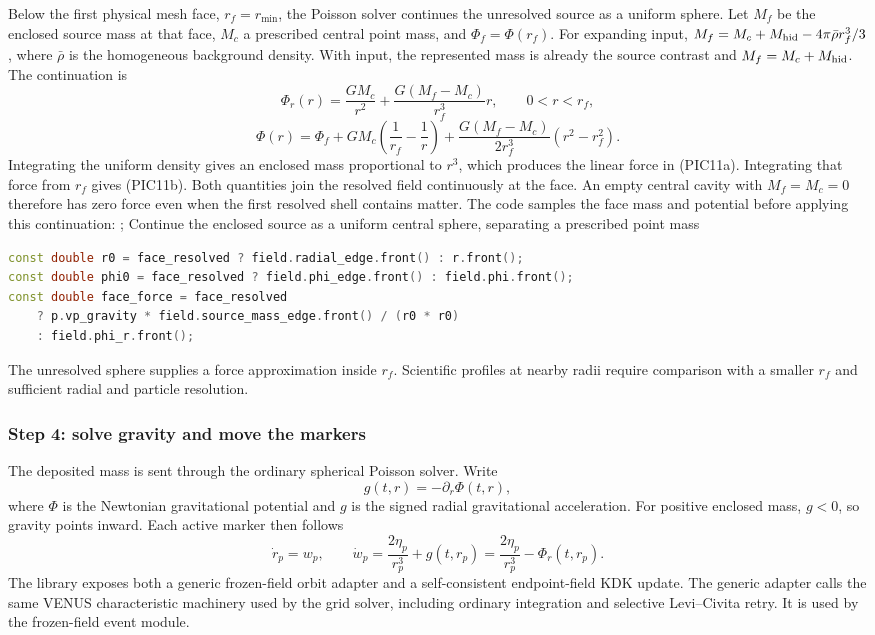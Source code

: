 Below the first physical mesh face, \(r_f=r_{\min}\), the Poisson solver
continues the unresolved source as a uniform sphere. Let \(M_f\) be the
enclosed source mass at that face, \(M_c\) a prescribed central point mass,
and \(\Phi_f=\Phi(r_f)\). For expanding  input,
\(M_f=M_c+M_{\rm hid}-4\pi\bar\rho r_f^3/3\), where
\(\bar\rho\) is the homogeneous background density. With
 input, the represented mass is already the
source contrast and \(M_f=M_c+M_{\rm hid}\). The continuation is
\[
 \Phi_r(r)=\frac{GM_c}{r^2}
          +\frac{G(M_f-M_c)}{r_f^3}r,\qquad 0<r<r_f,       \tag{PIC11a}
\]
\[
 \Phi(r)=\Phi_f+GM_c\left(\frac{1}{r_f}-\frac{1}{r}\right)
       +\frac{G(M_f-M_c)}{2r_f^3}(r^2-r_f^2).             \tag{PIC11b}
\]
Integrating the uniform density gives an enclosed mass proportional to
\(r^3\), which produces the linear force in (PIC11a). Integrating that
force from \(r_f\) gives (PIC11b). Both quantities join the resolved field
continuously at the face. An empty central cavity with \(M_f=M_c=0\)
therefore has zero force even when the first resolved shell contains matter.
The code samples the face mass and potential before applying this continuation:
{; }
{Continue the enclosed source as a uniform central sphere, separating a prescribed point mass}
\begin{lstlisting}[language=C++]
const double r0 = face_resolved ? field.radial_edge.front() : r.front();
const double phi0 = face_resolved ? field.phi_edge.front() : field.phi.front();
const double face_force = face_resolved
    ? p.vp_gravity * field.source_mass_edge.front() / (r0 * r0)
    : field.phi_r.front();
\end{lstlisting}
The unresolved sphere supplies a force approximation inside \(r_f\).
Scientific profiles at nearby radii require comparison with a smaller
\(r_f\) and sufficient radial and particle resolution.

\subsubsection{Step 4: solve gravity and move the markers}

The deposited mass is sent through the ordinary spherical Poisson solver.
Write
\[
 g(t,r)=-\partial_r\Phi(t,r),
\]
where \(\Phi\) is the Newtonian gravitational potential and \(g\) is the
signed radial gravitational acceleration.  For positive enclosed mass,
\(g<0\), so gravity points inward.  Each active marker then follows
\[
 \dot r_p=w_p,\qquad
 \dot w_p=\frac{2\eta_p}{r_p^3}+g(t,r_p)
          =\frac{2\eta_p}{r_p^3}-\Phi_r(t,r_p).          \tag{PIC12}
\]
The library exposes both a generic frozen-field orbit adapter and a
self-consistent endpoint-field KDK update.  The generic adapter calls the same
VENUS characteristic machinery used by the grid solver, including ordinary
integration and selective Levi--Civita retry.  It is used by the frozen-field
event module.

